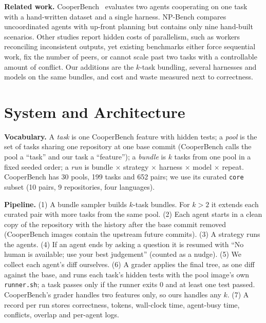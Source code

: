 \documentclass[sigconf,nonacm]{acmart}
\begin{document}
\textbf{Related work.} CooperBench~\cite{cooperbench} evaluates two agents cooperating on one task with a hand-written dataset and a single harness. NP-Bench compares uncoordinated agents with up-front planning but contains only nine hand-built scenarios. Other studies report hidden costs of parallelism, such as workers reconciling inconsistent outputs, yet existing benchmarks either force sequential work, fix the number of peers, or cannot scale past two tasks with a controllable amount of conflict. Our additions are the $k$-task bundling, several harnesses and models on the same bundles, and cost and waste measured next to correctness.

\section{System and Architecture}
\textbf{Vocabulary.} A \emph{task} is one CooperBench feature with hidden tests; a \emph{pool} is the set of tasks sharing one repository at one base commit (CooperBench calls the pool a ``task'' and our task a ``feature''); a \emph{bundle} is $k$ tasks from one pool in a fixed seeded order; a \emph{run} is bundle $\times$ strategy $\times$ harness $\times$ model $\times$ repeat. CooperBench has 30 pools, 199 tasks and 652 pairs; we use its curated \texttt{core} subset (10 pairs, 9 repositories, four languages).

\textbf{Pipeline.} (1) A bundle sampler builds $k$-task bundles. For $k>2$ it extends each curated pair with more tasks from the same pool. (2) Each agent starts in a clean copy of the repository with the history after the base commit removed (CooperBench images contain the upstream future commits). (3) A strategy runs the agents. (4) If an agent ends by asking a question it is resumed with ``No human is available; use your best judgement'' (counted as a nudge). (5) We collect each agent's diff ourselves. (6) A grader applies the final tree, as one diff against the base, and runs each task's hidden tests with the pool image's own \texttt{runner.sh}; a task passes only if the runner exits 0 and at least one test passed. CooperBench's grader handles two features only, so ours handles any $k$. (7) A record per run stores correctness, tokens, wall-clock time, agent-busy time, conflicts, overlap and per-agent logs.
\end{document}
